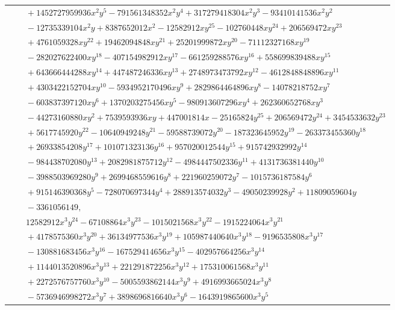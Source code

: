 \documentclass[11pt]{article}
\begin{document}
\begin{longtable}{@{}ll@{}}
 & $\quad +1452727959936x^{2}y^{5}-791561348352x^{2}y^{4}+317279418304x^{2}y^{3}-93410141536x^{2}y^{2}$\\
 & $\quad -12735339104x^{2}y+8387652012x^{2}-12582912xy^{25}-102760448xy^{24}+206569472xy^{23}$\\
 & $\quad +4761059328xy^{22}+19462094848xy^{21}+25201999872xy^{20}-71112327168xy^{19}$\\
 & $\quad -282027622400xy^{18}-407154982912xy^{17}-661259288576xy^{16}+558699839488xy^{15}$\\
 & $\quad +643666444288xy^{14}+447487246336xy^{13}+2748973473792xy^{12}-4612848848896xy^{11}$\\
 & $\quad +4303422152704xy^{10}-5934952170496xy^{9}+2829864464896xy^{8}-14078218752xy^{7}$\\
 & $\quad -603837397120xy^{6}+1370203275456xy^{5}-980913607296xy^{4}+262360652768xy^{3}$\\
 & $\quad -44273160880xy^{2}+7539593936xy+447001814x-25165824y^{25}+206569472y^{24}+3454533632y^{23}$\\
 & $\quad +5617745920y^{22}-10640949248y^{21}-59588739072y^{20}-187323645952y^{19}-263373455360y^{18}$\\
 & $\quad +26933854208y^{17}+101071323136y^{16}+957020012544y^{15}+915742932992y^{14}$\\
 & $\quad -984438702080y^{13}+2082981875712y^{12}-4984447502336y^{11}+4131736381440y^{10}$\\
 & $\quad -3988503969280y^{9}+2699468559616y^{8}+221960259072y^{7}-1015736187584y^{6}$\\
 & $\quad +915146390368y^{5}-728070697344y^{4}+288913574032y^{3}-49050239928y^{2}+11809059604y$\\
 & $\quad -3361056149,$\\
 & $\quad 12582912x^{3}y^{24}-67108864x^{3}y^{23}-1015021568x^{3}y^{22}-1915224064x^{3}y^{21}$\\
 & $\quad +4178575360x^{3}y^{20}+36134977536x^{3}y^{19}+105987440640x^{3}y^{18}-9196535808x^{3}y^{17}$\\
 & $\quad -130881683456x^{3}y^{16}-167529414656x^{3}y^{15}-402957664256x^{3}y^{14}$\\
 & $\quad +1144013520896x^{3}y^{13}+221291872256x^{3}y^{12}+175310061568x^{3}y^{11}$\\
 & $\quad +2272576757760x^{3}y^{10}-5005593862144x^{3}y^{9}+4916993665024x^{3}y^{8}$\\
 & $\quad -5736946998272x^{3}y^{7}+3898696816640x^{3}y^{6}-1643919865600x^{3}y^{5}$\\

\end{longtable}
\end{document}
